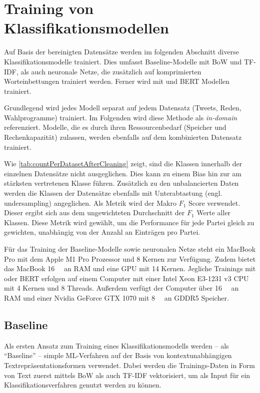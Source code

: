 
\chapter{Training von Klassifikationsmodellen} \label{ch:crispDm_2}

Auf Basis der bereinigten Datensätze werden im folgenden Abschnitt diverse Klassifikationsmodelle trainiert. Dies umfasst Baseline-Modelle mit \ac{BoW} und \ac{TF-IDF}, als auch neuronale Netze, die zusätzlich auf komprimierten Worteinbettungen trainiert werden. Ferner wird mit \ft und \ac{BERT} Modellen trainiert.

Grundlegend wird jedes Modell separat auf jedem Datensatz (Tweets, Reden, Wahlprogramme) trainiert. Im Folgenden wird diese Methode als \textit{in-domain} referenziert. Modelle, die es durch ihren Ressourcenbedarf (Speicher und Rechenkapazität) zulassen, werden ebenfalls auf dem kombinierten Datensatz trainiert. 

Wie \autoref{tab:countPerDatasetAfterCleaning} zeigt, sind die Klassen innerhalb der einzelnen Datensätze nicht ausgeglichen. Dies kann zu einem Bias hin zur am stärksten vertretenen Klasse führen. Zusätzlich zu den unbalancierten Daten werden die Klassen der Datensätze ebenfalls mit Unterabtastung (engl. undersampling) angeglichen. Als Metrik wird der Makro \(F_1\) Score verwendet. Dieser ergibt sich aus dem ungewichteten Durchschnitt der \(F_1\) Werte aller Klassen. Diese Metrik wird gewählt, um die Performance für jede Partei gleich zu gewichten, unabhängig von der Anzahl an Einträgen pro Partei.

Für das Training der Baseline-Modelle sowie neuronalen Netze steht ein MacBook Pro mit dem Apple M1 Pro Prozessor und \num{8} Kernen zur Verfügung. Zudem bietet das MacBook \SI{16}{\giga\byte} an \ac{RAM} und eine \ac{GPU} mit \num{14} Kernen. Jegliche Trainings mit \ft oder \ac{BERT} erfolgen auf einem Computer mit einer Intel Xeon E3-1231 v3 \ac{CPU} mit \num{4} Kernen und \num{8} Threads. Außerdem verfügt der Computer über \SI{16}{\giga\byte} an \ac{RAM} und einer Nvidia GeForce GTX 1070 mit \SI{8}{\giga\byte} an \ac{GDDR5} Speicher.

\section{Baseline} \label{sec:trainingBaseline}

Als ersten Ansatz zum Training eines Klassifikationsmodells werden -- als \enquote{Baseline} -- simple \ac{ML}-Verfahren auf der Basis von kontextunabhängigen Textrepräsentationsformen verwendet. Dabei werden die Trainings-Daten in Form von Text zuerst mittels \ac{BoW} als auch \ac{TF-IDF} vektorisiert, um als Input für ein Klassifikationsverfahren genutzt werden zu können.

